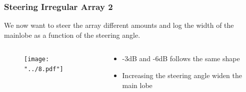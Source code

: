 \documentclass[compress]{beamer}
\begin{document}

\begin{frame} %
    \frametitle{Steering Irregular Array 2}
    We now want to steer the array different amounts and log the width of the
    mainlobe as a function of the steering angle.

    \begin{columns}
        \begin{column}{0.5\textwidth}
            \begin{figure}
                \texttt{[image: "../8.pdf"]}
            \end{figure}
        \end{column}
        \begin{column}{0.5\textwidth}
            \begin{itemize}
                \item -3dB and -6dB follows the same shape
                \item Increasing the steering angle widen the main lobe
            \end{itemize}
        \end{column}
    \end{columns}
\end{frame} %
\end{document}
